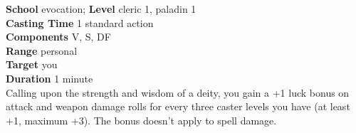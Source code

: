 \textbf{School} evocation; \textbf{Level} cleric 1, paladin 1\\
\textbf{Casting Time} 1 standard action\\
\textbf{Components} V, S, DF\\
\textbf{Range} personal\\
\textbf{Target} you\\
\textbf{Duration} 1 minute\\
Calling upon the strength and wisdom of a deity, you gain a +1 luck bonus on attack and weapon damage rolls for every three caster levels you have (at least +1, maximum +3). The bonus doesn't apply to spell damage.\\
